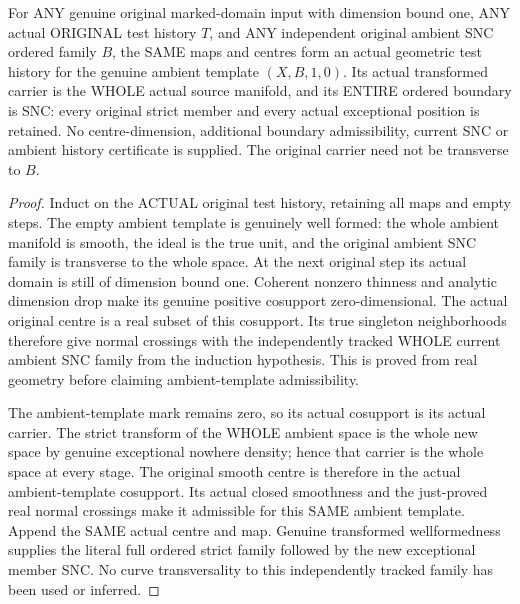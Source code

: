 \begin{theorem}
\label{hir:sharp-actual-domain-one-history-whole-ambient-boundary-template}
\leanok
For ANY genuine original marked-domain input with dimension bound one,
ANY actual ORIGINAL test history $T$, and ANY independent original ambient
SNC ordered family $B$, the SAME maps and centres form an actual geometric
test history for the genuine ambient template $(X,B,1,0)$. Its actual
transformed carrier is the WHOLE actual source manifold, and its ENTIRE
ordered boundary is SNC: every original strict member and every actual
exceptional position is retained. No centre-dimension, additional
boundary admissibility, current SNC or ambient history certificate is
supplied. The original carrier need not be transverse to $B$.
\end{theorem}
\begin{proof}
Induct on the ACTUAL original test history, retaining all maps and empty
steps. The empty ambient template is genuinely well formed: the whole
ambient manifold is smooth, the ideal is the true unit, and the original
ambient SNC family is transverse to the whole space. At the next original
step its actual domain is still of dimension bound one. Coherent nonzero
thinness and analytic dimension drop make its genuine positive cosupport
zero-dimensional. The actual original centre is a real subset of this
cosupport. Its true singleton neighborhoods therefore give normal
crossings with the independently tracked WHOLE current ambient SNC family
from the induction hypothesis. This is proved from real geometry before
claiming ambient-template admissibility.

The ambient-template mark remains zero, so its actual cosupport is its
actual carrier. The strict transform of the WHOLE ambient space is the
whole new space by genuine exceptional nowhere density; hence that
carrier is the whole space at every stage. The original smooth centre
is therefore in the actual ambient-template cosupport. Its actual
closed smoothness and the just-proved real normal crossings make it
admissible for this SAME ambient template. Append the SAME actual centre
and map. Genuine transformed wellformedness supplies the literal full
ordered strict family followed by the new exceptional member SNC. No
curve transversality to this independently tracked family has been used
or inferred.
\end{proof}

